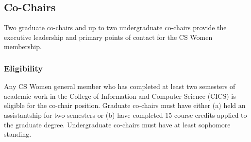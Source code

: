 \subsection{Co-Chairs}
\label{sec:cochairs}
Two graduate co-chairs and up to two undergraduate co-chairs provide the executive leadership and primary points of contact for the CS Women membership.

\subsubsection{Eligibility}
\label{sec:cochairs_eligibility}
Any CS Women general member who has completed at least two semesters of academic work in the College of Information and Computer Science (CICS) is eligible for the co-chair position. Graduate co-chairs must have either (a) held an assistantship for two semesters or (b) have completed 15 course credits applied to the graduate degree. Undergraduate co-chairs must have at least sophomore standing.

